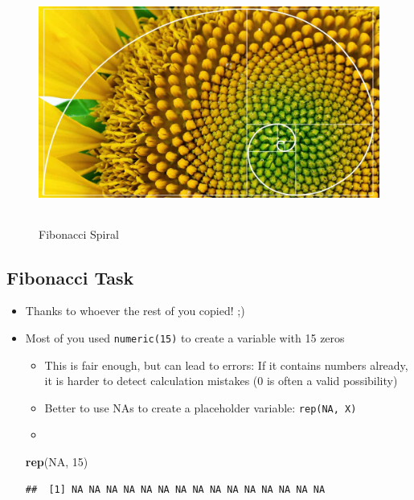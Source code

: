 \documentclass[
]{book}
\newenvironment{Shaded}{\begin{snugshade}}{\end{snugshade}}
\newcommand{\ConstantTok}[1]{\textcolor[rgb]{0.56,0.35,0.01}{#1}}
\newcommand{\DecValTok}[1]{\textcolor[rgb]{0.00,0.00,0.81}{#1}}
\newcommand{\FunctionTok}[1]{\textcolor[rgb]{0.13,0.29,0.53}{\textbf{#1}}}
\newcommand{\NormalTok}[1]{#1}
\providecommand{\tightlist}{%
  \setlength{\itemsep}{0pt}\setlength{\parskip}{0pt}}
\begin{document}
\begin{figure}
\centering
\includegraphics[width=\textwidth,height=3.125in]{./img/fibonacci.jpg}
\caption{Fibonacci Spiral}
\end{figure}

\subsection{Fibonacci Task}\label{fibonacci-task}

\begin{itemize}
\tightlist
\item
  Thanks to whoever the rest of you copied! ;)
\item
  Most of you used \texttt{numeric(15)} to create a variable with 15 zeros

  \begin{itemize}
  \tightlist
  \item
    This is fair enough, but can lead to errors: If it contains numbers already, it is harder to detect calculation mistakes (0 is often a valid possibility)
  \item
    Better to use NAs to create a placeholder variable: \texttt{rep(NA,\ X)}
  \item
  \end{itemize}

\begin{Shaded}
\begin{Highlighting}[]
\FunctionTok{rep}\NormalTok{(}\ConstantTok{NA}\NormalTok{, }\DecValTok{15}\NormalTok{)}
\end{Highlighting}
\end{Shaded}

\begin{verbatim}
##  [1] NA NA NA NA NA NA NA NA NA NA NA NA NA NA NA
\end{verbatim}
\end{itemize}
\end{document}
